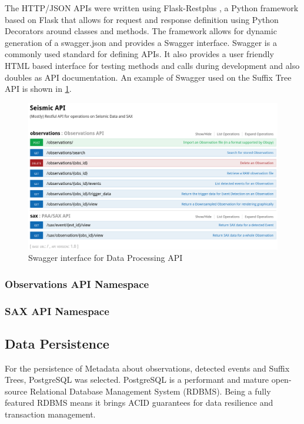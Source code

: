 \documentclass[../report.tex]{subfiles}
\begin{document}
	The HTTP/JSON APIs were written using Flask-Restplus \citep{restplus}, a Python framework based on Flask that allows for request and response definition using Python Decorators around classes and methods.  The framework allows for dynamic generation of a swagger.json and provides a Swagger interface.  Swagger is a commonly used standard for defining APIs.  It also provides a user friendly HTML based interface for testing methods and calls during development and also doubles as API documentation.  An example of Swagger used on the Suffix Tree API is shown in \cref{fig:api}.
	
\begin{figure}[ht]
	\centering
	\includegraphics[width=1\linewidth]{img/api}
	\caption{Swagger interface for Data Processing API}
	\label{fig:api}
\end{figure}

\subsubsection{Observations API Namespace}
\subsubsection{SAX API Namespace}

\subsection{Data Persistence} \label{sec:data-persistence}
	For the persistence of Metadata about observations, detected events and Suffix Trees, PostgreSQL was selected.  PostgreSQL is a performant and mature open-source Relational Database Management System (RDBMS).  Being a fully featured RDBMS means it brings ACID guarantees for data resilience and transaction management.
	
\end{document}
